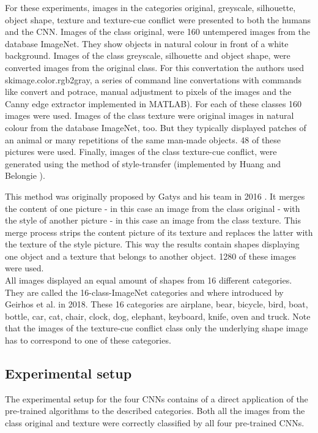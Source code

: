 \documentclass[runningheads,a4paper]{llncs}
\begin{document}
For these experiments, images in the categories original, greyscale, silhouette, object shape, texture  and texture-cue conflict were presented to both the humans and the CNN. Images of the class original, were 160 untempered images from the database ImageNet. They show objects in natural colour in front of a white background.
Images of the class greyscale, silhouette and object shape, were converted images from the original class. For this convertation the authors used skimage.color.rgb2gray, a series of command line convertations with commands like convert and potrace, manual adjustment to pixels of the images and the Canny edge extractor implemented in MATLAB).
For each of these classes 160 images were used. Images of the class texture were original images in natural colour from the database ImageNet, too. But they typically displayed patches of an animal or many repetitions of the same man-made objects. 48 of these pictures were used. Finally, images of the class texture-cue conflict, were generated using the method of style-transfer (implemented by Huang and Belongie \citep{huang2017arbitrary}).

This method was originally proposed by Gatys and his team in 2016 \citep{gatys2016image}. It merges the content of one picture - in this case an image from the class original - with the style of another picture - in this case an image from the class texture. This merge process strips the content picture of its texture and replaces the latter with the texture of the style picture. This way the results contain shapes displaying one object and a texture that belongs to another object. 1280 of these images were used.\\

All images displayed an equal amount of shapes from 16 different categories. They are called the 16-class-ImageNet categories and where introduced by Geirhos et al. in 2018.%
These 16 categories are airplane, bear, bicycle, bird, boat, bottle, car, cat, chair, clock, dog, elephant, keyboard, knife, oven and truck. Note that the images of the texture-cue conflict class only the underlying shape image has to correspond to one of these categories.


\subsection{Experimental setup}
The experimental setup for the four CNNs contains of a direct application of the pre-trained algorithms to the described categories. Both all the images from the class original and texture were correctly classified by all four pre-trained CNNs. \\
\end{document}
